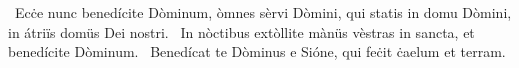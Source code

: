 \psalmChapterWithInscription{}
{ }
{%
~Ecċe nunc benedícite Dòminum, òmnes sèrvi Dòmini, qui statis in domu Dòmini, in átriïs domüs Dei nostri. 
~In nòctibus extòllite mànüs vèstras in sancta, et benedícite Dòminum. 
~Benedícat te Dòminus e Sióne, qui feċit ċaelum et terram. 
}
